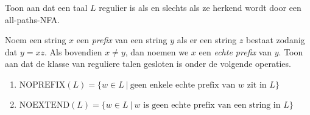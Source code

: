 \documentclass[a4paper]{article}
\begin{document}
\begin{question}
Toon aan dat een taal $L$ regulier is als en slechts als ze herkend wordt door een all-paths-NFA.
\end{question}

\begin{question}
Noem een string $x$ een \emph{prefix} van een string $y$ als er een string $z$ bestaat zodanig dat $y = xz$. Als bovendien $x \neq y$, dan noemen we $x$ een \emph{echte prefix} van $y$. Toon aan dat de klasse van reguliere talen gesloten is onder de volgende operaties.
\begin{enumerate}
  \item $\mathrm{NOPREFIX} (L) = \{ w \in L \ | \ \mbox{geen enkele echte prefix van $w$ zit in $L$} \}$
  \item $\mathrm{NOEXTEND} (L) = \{ w \in L \ | \ \mbox{$w$ is geen echte prefix van een string in $L$} \}$
\end{enumerate}
\end{question}
\end{document}
